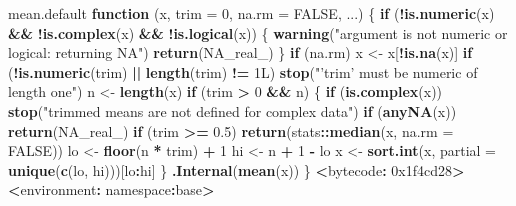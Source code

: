 \documentclass[10pt,a4paper]{book}
\newenvironment{Shaded}{\begin{snugshade}}{\end{snugshade}}
\newcommand{\KeywordTok}[1]{\textcolor[rgb]{0.13,0.29,0.53}{\textbf{#1}}}
\newcommand{\DataTypeTok}[1]{\textcolor[rgb]{0.13,0.29,0.53}{#1}}
\newcommand{\DecValTok}[1]{\textcolor[rgb]{0.00,0.00,0.81}{#1}}
\newcommand{\FloatTok}[1]{\textcolor[rgb]{0.00,0.00,0.81}{#1}}
\newcommand{\StringTok}[1]{\textcolor[rgb]{0.31,0.60,0.02}{#1}}
\newcommand{\OtherTok}[1]{\textcolor[rgb]{0.56,0.35,0.01}{#1}}
\newcommand{\ControlFlowTok}[1]{\textcolor[rgb]{0.13,0.29,0.53}{\textbf{#1}}}
\newcommand{\OperatorTok}[1]{\textcolor[rgb]{0.81,0.36,0.00}{\textbf{#1}}}
\newcommand{\ErrorTok}[1]{\textcolor[rgb]{0.64,0.00,0.00}{\textbf{#1}}}
\newcommand{\NormalTok}[1]{#1}
\begin{document}
\begin{Shaded}
\begin{Highlighting}[]
\NormalTok{mean.default}
\ControlFlowTok{function}\NormalTok{ (x, }\DataTypeTok{trim =} \DecValTok{0}\NormalTok{, }\DataTypeTok{na.rm =} \OtherTok{FALSE}\NormalTok{, ...) }
\NormalTok{\{}
    \ControlFlowTok{if}\NormalTok{ (}\OperatorTok{!}\KeywordTok{is.numeric}\NormalTok{(x) }\OperatorTok{&&}\StringTok{ }\OperatorTok{!}\KeywordTok{is.complex}\NormalTok{(x) }\OperatorTok{&&}\StringTok{ }\OperatorTok{!}\KeywordTok{is.logical}\NormalTok{(x)) \{}
        \KeywordTok{warning}\NormalTok{(}\StringTok{"argument is not numeric or logical: returning NA"}\NormalTok{)}
        \KeywordTok{return}\NormalTok{(}\OtherTok{NA_real_}\NormalTok{)}
\NormalTok{    \}}
    \ControlFlowTok{if}\NormalTok{ (na.rm) }
\NormalTok{        x <-}\StringTok{ }\NormalTok{x[}\OperatorTok{!}\KeywordTok{is.na}\NormalTok{(x)]}
    \ControlFlowTok{if}\NormalTok{ (}\OperatorTok{!}\KeywordTok{is.numeric}\NormalTok{(trim) }\OperatorTok{||}\StringTok{ }\KeywordTok{length}\NormalTok{(trim) }\OperatorTok{!=}\StringTok{ }\NormalTok{1L) }
        \KeywordTok{stop}\NormalTok{(}\StringTok{"'trim' must be numeric of length one"}\NormalTok{)}
\NormalTok{    n <-}\StringTok{ }\KeywordTok{length}\NormalTok{(x)}
    \ControlFlowTok{if}\NormalTok{ (trim }\OperatorTok{>}\StringTok{ }\DecValTok{0} \OperatorTok{&&}\StringTok{ }\NormalTok{n) \{}
        \ControlFlowTok{if}\NormalTok{ (}\KeywordTok{is.complex}\NormalTok{(x)) }
            \KeywordTok{stop}\NormalTok{(}\StringTok{"trimmed means are not defined for complex data"}\NormalTok{)}
        \ControlFlowTok{if}\NormalTok{ (}\KeywordTok{anyNA}\NormalTok{(x)) }
            \KeywordTok{return}\NormalTok{(}\OtherTok{NA_real_}\NormalTok{)}
        \ControlFlowTok{if}\NormalTok{ (trim }\OperatorTok{>=}\StringTok{ }\FloatTok{0.5}\NormalTok{) }
            \KeywordTok{return}\NormalTok{(stats}\OperatorTok{::}\KeywordTok{median}\NormalTok{(x, }\DataTypeTok{na.rm =} \OtherTok{FALSE}\NormalTok{))}
\NormalTok{        lo <-}\StringTok{ }\KeywordTok{floor}\NormalTok{(n }\OperatorTok{*}\StringTok{ }\NormalTok{trim) }\OperatorTok{+}\StringTok{ }\DecValTok{1}
\NormalTok{        hi <-}\StringTok{ }\NormalTok{n }\OperatorTok{+}\StringTok{ }\DecValTok{1} \OperatorTok{-}\StringTok{ }\NormalTok{lo}
\NormalTok{        x <-}\StringTok{ }\KeywordTok{sort.int}\NormalTok{(x, }\DataTypeTok{partial =} \KeywordTok{unique}\NormalTok{(}\KeywordTok{c}\NormalTok{(lo, hi)))[lo}\OperatorTok{:}\NormalTok{hi]}
\NormalTok{    \}}
    \KeywordTok{.Internal}\NormalTok{(}\KeywordTok{mean}\NormalTok{(x))}
\NormalTok{\}}
\OperatorTok{<}\NormalTok{bytecode}\OperatorTok{:}\StringTok{ }\DecValTok{0x1f4cd28}\OperatorTok{>}
\ErrorTok{<}\NormalTok{environment}\OperatorTok{:}\StringTok{ }\NormalTok{namespace}\OperatorTok{:}\NormalTok{base}\OperatorTok{>}
\end{Highlighting}
\end{Shaded}
\end{document}
